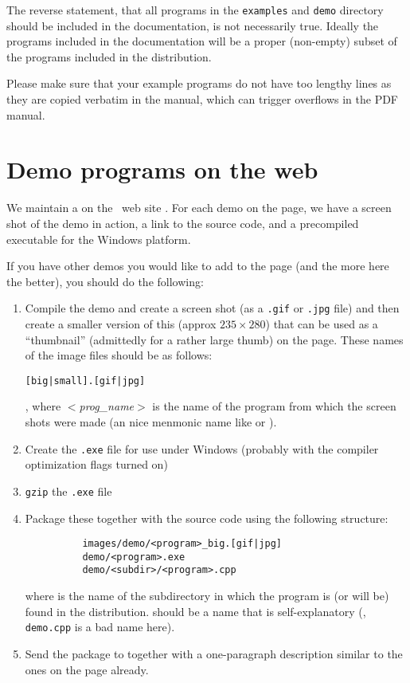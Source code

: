The reverse statement, that all programs in the \texttt{examples}
and \texttt{demo} directory should be included in the documentation,
is not necessarily true.  Ideally the programs included in the documentation
will be a proper (non-empty) subset of the programs included in the 
distribution.

Please make sure that your example programs do not have too lengthy lines
as they are copied verbatim in the manual, which can trigger overflows
in the PDF manual.

\section{Demo programs on the web\label{sec:demos_web_page}}

We maintain a  on the \cgal\ web site
.  For each demo on
the page, we have a screen shot of the demo in action, a link to the source
code, and a precompiled executable for the Windows platform.

If you have other demos you would like to add to the page (and the more 
here the better), you should do the following:
\begin{enumerate}
\item Compile the demo and create a screen shot (as a \texttt{.gif} or 
      \texttt{.jpg} file) and then create a smaller version of this 
      (approx $235 \times 280$) that can be used as a ``thumbnail'' 
      (admittedly for a rather large thumb) on the page.  These names of
      the image files should be as follows: 
      \centerline{\texttt{[big|small].[gif|jpg]}},
      where \textit{$<$prog\_name$>$} is the name of the program from which
      the screen shots were made (an nice menmonic name like 
       or ).

\item Create the \texttt{.exe} file for use under Windows (probably with the 
      compiler optimization flags turned on)
\item \texttt{gzip} the \texttt{.exe} file
\item Package these together with the source code using the following structure:
      \begin{verbatim}
          images/demo/<program>_big.[gif|jpg]
          demo/<program>.exe
          demo/<subdir>/<program>.cpp
      \end{verbatim}
      where  is the name of the subdirectory in which the program
      is (or will be) found in the distribution.  should be a 
      name that is self-explanatory (\eg, \texttt{demo.cpp} is a bad name here).

\item Send the package to  together with a one-paragraph description similar to the
      ones on the page already.
\end{enumerate}


